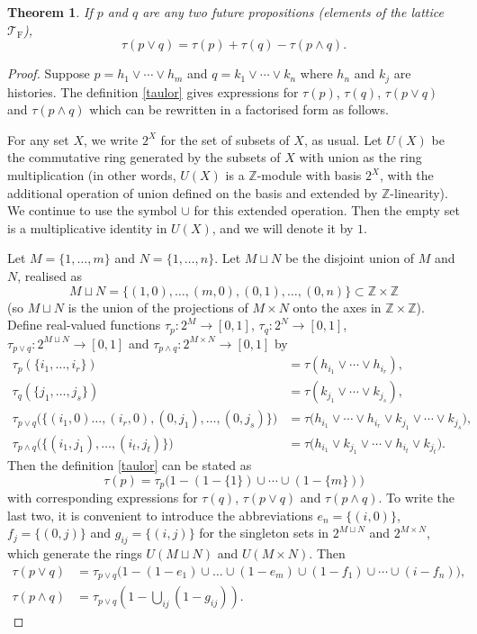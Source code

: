 \documentclass[12pt,a4paper,reqno]{article}
\renewcommand{\(}{\left(}
\renewcommand{\)}{\right)}
\newcommand{\Z}{\mathbb{Z}}
\newcommand{\TF}{\mathcal{T}_\text{F}}
\newcommand{\<}{\langle}
\renewcommand{\>}{\rangle}
\theoremstyle{plain} %
\newtheorem{thm}{Theorem}
\begin{document}
\begin{thm}\label{disj}
If $p$ and $q$ are any two future propositions (elements of the lattice $\TF$),
\[
\tau(p\lor q) = \tau(p) + \tau(q) - \tau(p\land q).
\]
\end{thm}
\begin{proof}
Suppose $p = h_1\lor\cdots\lor h_m$ and $q = k_1\lor\cdots\lor k_n$ where $h_n$ and $k_j$ are histories. The definition \eqref{taulor} gives expressions for $\tau(p)$, $\tau(q)$, $\tau(p\lor q)$ and $\tau(p\land q)$ which can be rewritten in a factorised form as follows.

For any set $X$, we write $2^X$ for the set of subsets of $X$, as usual. Let $U(X)$ be the commutative ring generated by the subsets of $X$ with union as the ring multiplication (in other words, $U(X)$ is a $\Z$-module with basis $2^X$, with the additional operation of union defined on the basis and extended by $\Z$-linearity). We continue to use the symbol $\cup$ for this extended operation. Then the empty set is a multiplicative identity in $U(X)$, and we will denote it by $1$.  

 Let $M = \{1,\ldots,m\}$ and $N = \{1,\ldots, n\}$. Let $M\sqcup N$ be the disjoint union of $M$ and $N$, realised as
\[
M\sqcup N = \{(1,0),\ldots,(m,0),(0,1),\ldots,(0,n)\} \subset \Z\times\Z
\]
(so $M\sqcup N$ is the union of the projections of $M\times N$ onto the axes in $\Z\times\Z$). Define real-valued functions $\tau_p: 2^M \to [0,1]$, $\tau_q: 2^N\to [0,1]$, $\tau_{p\lor q}:2^{M\sqcup N} \to [0,1]$ and $\tau_{p\land q}:2^{M\times N} \to [0,1]$ by
\begin{align*}
\tau_p(\{i_1,\ldots,i_r\}) &= \tau(h_{i_1}\lor\cdots\lor h_{i_r}),\\
\tau_q(\{j_1,\ldots,j_s\}) &= \tau(k_{j_1}\lor\cdots\lor k_{j_s}),\\
\tau_{p\lor q}\big(\{(i_1,0)\ldots,(i_r,0),(0,j_1),\ldots,(0,j_s)\}\big) &= \tau\big(h_{i_1}\lor\cdots\lor h_{i_r}\lor k_{j_1}\lor\cdots\lor k_{j_s}\big),\\
\tau_{p\land q}\big(\{(i_1,j_1),\ldots,(i_t,j_t)\}\big) &= \tau\big(h_{i_1}\lor k_{j_1}\lor\cdots\lor h_{i_t}\lor k_{j_t}\big).
\end{align*}
Then the definition \eqref{taulor} can be stated as 
\[
\tau(p) = \tau_p\big(1 - (1 - \{1\})\cup\cdots\cup(1 - \{m\})\big)
\]
with corresponding expressions for $\tau(q)$, $\tau(p\lor q)$ and $\tau(p\land q)$. To write the last two, it is convenient to introduce the abbreviations $e_n = \{(i,0)\}$, $f_j = \{(0,j)\}$  and $g_{ij} = \{(i,j)\}$ for the singleton sets in $2^{M\sqcup N}$ and $2^{M\times N}$, which generate the rings $U(M\sqcup N)$ and $U(M\times N)$. Then 
\begin{align*}
\tau(p\lor q) &= \tau_{p\lor q}\big(1 - (1 - e_1)\cup\ldots\cup(1-e_m)\cup(1-f_1)\cup\cdots\cup(i-f_n)\big),\\
\tau(p\land q) &= \tau_{p\lor q}\(1 - \bigcup_{ij}(1 - g_{ij})\).
\end{align*}


\end{proof}
\end{document}
